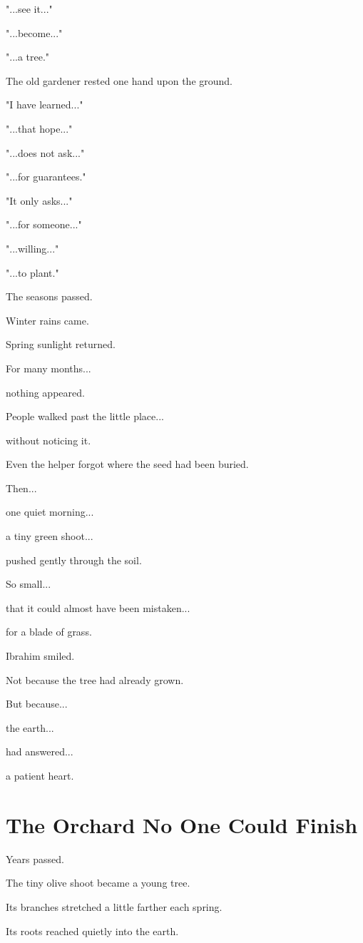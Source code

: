 \documentclass[12pt,openany]{book}
\begin{document}
"...see it..."

"...become..."

"...a tree."

The old gardener rested one hand upon the ground.

"I have learned..."

"...that hope..."

"...does not ask..."

"...for guarantees."

"It only asks..."

"...for someone..."

"...willing..."

"...to plant."

The seasons passed.

Winter rains came.

Spring sunlight returned.

For many months...

nothing appeared.

People walked past the little place...

without noticing it.

Even the helper forgot where the seed had been buried.

Then...

one quiet morning...

a tiny green shoot...

pushed gently through the soil.

So small...

that it could almost have been mistaken...

for a blade of grass.

Ibrahim smiled.

Not because the tree had already grown.

But because...

the earth...

had answered...

a patient heart.
\section*{The Orchard No One Could Finish}

Years passed.

The tiny olive shoot became a young tree.

Its branches stretched a little farther each spring.

Its roots reached quietly into the earth.
\end{document}

